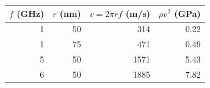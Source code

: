 \begin{tabular}{rrrr}
\hline
$f$ (GHz) & $r$ (nm) & $v=2\pi r f$ (m/s) & $\rho v^2$ (GPa) \\
\hline
1 & 50 & 314 & 0.22 \\
1 & 75 & 471 & 0.49 \\
5 & 50 & 1571 & 5.43 \\
6 & 50 & 1885 & 7.82 \\
\hline
\end{tabular}
